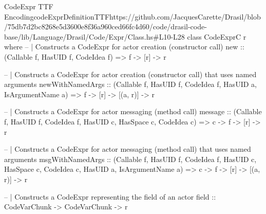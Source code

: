 \begin{haskell}{CodeExpr TTF Encoding}{codeExprDefinitionTTF}{https://github.com/JacquesCarette/Drasil/blob/75db7d2bc8268e5d3600e8f36a960ced66fc4d60/code/drasil-code-base/lib/Language/Drasil/Code/Expr/Class.hs\#L10-L28}
class CodeExprC r where
  -- | Constructs a CodeExpr for actor creation (constructor call)
  new :: (Callable f, HasUID f, CodeIdea f) => f -> [r] -> r
  
  -- | Constructs a CodeExpr for actor creation (constructor call) that uses named arguments
  newWithNamedArgs :: (Callable f, HasUID f, CodeIdea f, HasUID a, 
    IsArgumentName a) => f -> [r] -> [(a, r)] -> r
  
  -- | Constructs a CodeExpr for actor messaging (method call)
  message :: (Callable f, HasUID f, CodeIdea f, HasUID c, HasSpace c, CodeIdea c) 
    => c -> f -> [r] -> r
  
  -- | Constructs a CodeExpr for actor messaging (method call) that uses named arguments
  msgWithNamedArgs :: (Callable f, HasUID f, CodeIdea f, HasUID c, HasSpace c, 
    CodeIdea c, HasUID a, IsArgumentName a) => c -> f -> [r] -> [(a, r)] -> 
    r
  
  -- | Constructs a CodeExpr representing the field of an actor
  field :: CodeVarChunk -> CodeVarChunk -> r
\end{haskell}
